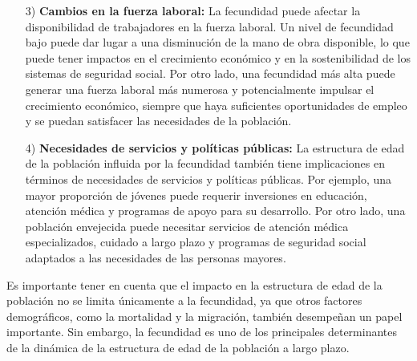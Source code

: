 \documentclass[8pt,a4paper]{beamer}
\begin{document}
{\begin{frame}{}
\begin{block}{}
\begin{enumerate}
\item[3)] \textbf{Cambios en la fuerza laboral:} La fecundidad puede afectar la disponibilidad de trabajadores en la fuerza laboral. Un nivel de fecundidad bajo puede dar lugar a una disminución de la mano de obra disponible, lo que puede tener impactos en el crecimiento económico y en la sostenibilidad de los sistemas de seguridad social. Por otro lado, una fecundidad más alta puede generar una fuerza laboral más numerosa y potencialmente impulsar el crecimiento económico, siempre que haya suficientes oportunidades de empleo y se puedan satisfacer las necesidades de la población.

\end{enumerate}
\end{block}
\end{frame}


\begin{frame}{}
\begin{block}{}
\setlength{\parskip}{3px}
\justifying
\begin{enumerate}
\setlength{\parskip}{3px}
\justifying
\item[4)] \textbf{Necesidades de servicios y políticas públicas:} La estructura de edad de la población influida por la fecundidad también tiene implicaciones en términos de necesidades de servicios y políticas públicas. Por ejemplo, una mayor proporción de jóvenes puede requerir inversiones en educación, atención médica y programas de apoyo para su desarrollo. Por otro lado, una población envejecida puede necesitar servicios de atención médica especializados, cuidado a largo plazo y programas de seguridad social adaptados a las necesidades de las personas mayores.
\end{enumerate}
Es importante tener en cuenta que el impacto en la estructura de edad de la población no se limita únicamente a la fecundidad, ya que otros factores demográficos, como la mortalidad y la migración, también desempeñan un papel importante. Sin embargo, la fecundidad es uno de los principales determinantes de la dinámica de la estructura de edad de la población a largo plazo.

\end{block}
\end{frame}



}
\end{document}
